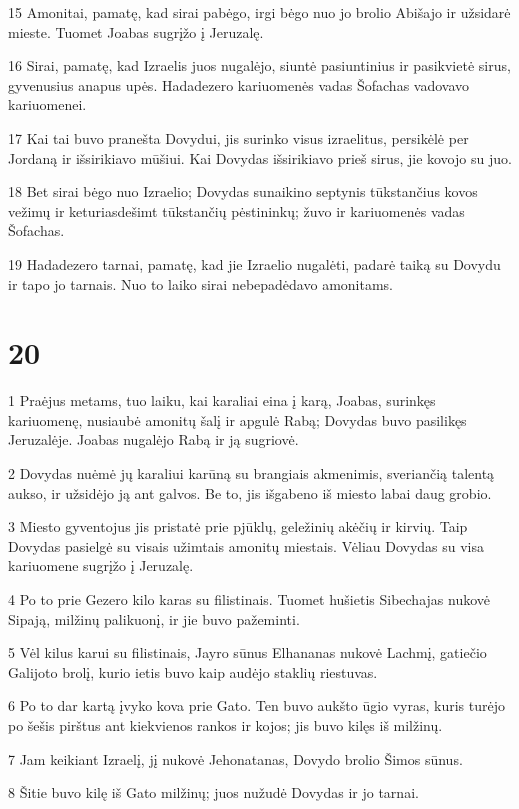 \par 15 Amonitai, pamatę, kad sirai pabėgo, irgi bėgo nuo jo brolio Abišajo ir užsidarė mieste. Tuomet Joabas sugrįžo į Jeruzalę. 
\par 16 Sirai, pamatę, kad Izraelis juos nugalėjo, siuntė pasiuntinius ir pasikvietė sirus, gyvenusius anapus upės. Hadadezero kariuomenės vadas Šofachas vadovavo kariuomenei. 
\par 17 Kai tai buvo pranešta Dovydui, jis surinko visus izraelitus, persikėlė per Jordaną ir išsirikiavo mūšiui. Kai Dovydas išsirikiavo prieš sirus, jie kovojo su juo. 
\par 18 Bet sirai bėgo nuo Izraelio; Dovydas sunaikino septynis tūkstančius kovos vežimų ir keturiasdešimt tūkstančių pėstininkų; žuvo ir kariuomenės vadas Šofachas. 
\par 19 Hadadezero tarnai, pamatę, kad jie Izraelio nugalėti, padarė taiką su Dovydu ir tapo jo tarnais. Nuo to laiko sirai nebepadėdavo amonitams.



\chapter{20}


\par 1 Praėjus metams, tuo laiku, kai karaliai eina į karą, Joabas, surinkęs kariuomenę, nusiaubė amonitų šalį ir apgulė Rabą; Dovydas buvo pasilikęs Jeruzalėje. Joabas nugalėjo Rabą ir ją sugriovė. 
\par 2 Dovydas nuėmė jų karaliui karūną su brangiais akmenimis, sveriančią talentą aukso, ir užsidėjo ją ant galvos. Be to, jis išgabeno iš miesto labai daug grobio. 
\par 3 Miesto gyventojus jis pristatė prie pjūklų, geležinių akėčių ir kirvių. Taip Dovydas pasielgė su visais užimtais amonitų miestais. Vėliau Dovydas su visa kariuomene sugrįžo į Jeruzalę. 
\par 4 Po to prie Gezero kilo karas su filistinais. Tuomet hušietis Sibechajas nukovė Sipają, milžinų palikuonį, ir jie buvo pažeminti. 
\par 5 Vėl kilus karui su filistinais, Jayro sūnus Elhananas nukovė Lachmį, gatiečio Galijoto brolį, kurio ietis buvo kaip audėjo staklių riestuvas. 
\par 6 Po to dar kartą įvyko kova prie Gato. Ten buvo aukšto ūgio vyras, kuris turėjo po šešis pirštus ant kiekvienos rankos ir kojos; jis buvo kilęs iš milžinų. 
\par 7 Jam keikiant Izraelį, jį nukovė Jehonatanas, Dovydo brolio Šimos sūnus. 
\par 8 Šitie buvo kilę iš Gato milžinų; juos nužudė Dovydas ir jo tarnai.



